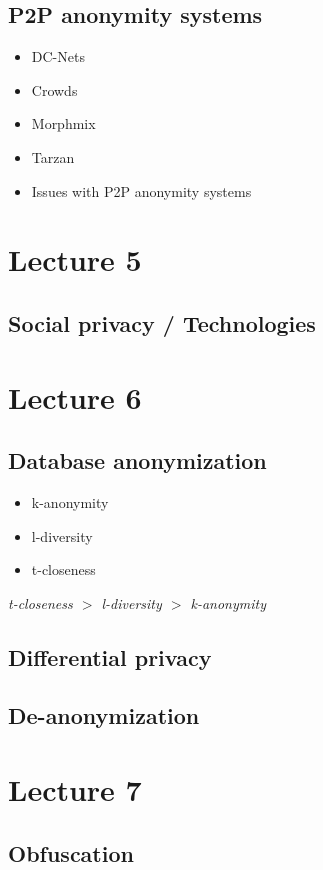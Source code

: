 \documentclass[a4paper,12pt,english]{article}
\begin{document}
\subsection{P2P anonymity systems}
\begin{itemize}
	\item DC-Nets
	\item Crowds
	\item Morphmix
	\item Tarzan
	\item Issues with P2P anonymity systems
\end{itemize}

\section{Lecture 5}
\subsection{Social privacy / Technologies}

\section{Lecture 6}
\subsection{Database anonymization}
\begin{itemize}
	\item k-anonymity
	\item l-diversity
	\item t-closeness
\end{itemize}
\emph{t-closeness $>$ l-diversity $>$ k-anonymity}

\subsection{Differential privacy}

\subsection{De-anonymization}

\section{Lecture 7}
\subsection{Obfuscation}
\end{document}

